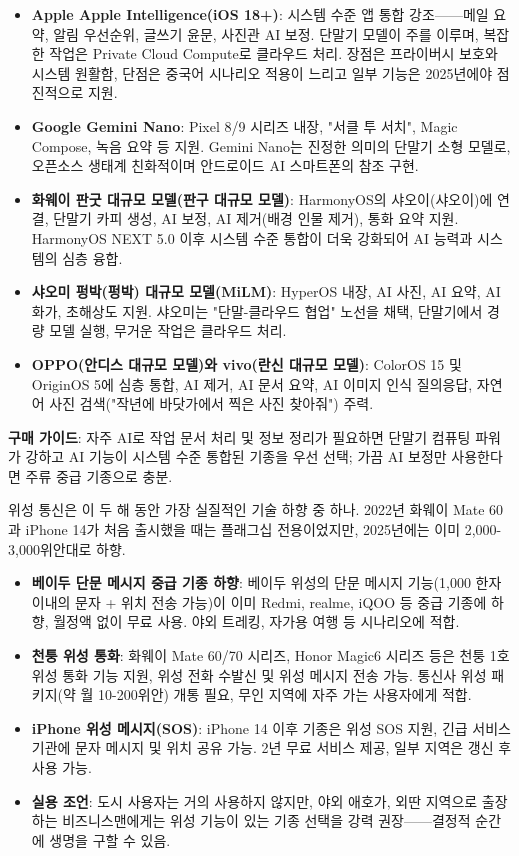 \begin{itemize}
  \item \textbf{Apple Apple Intelligence(iOS 18+)}: 시스템 수준 앱 통합 강조——메일 요약, 알림 우선순위, 글쓰기 윤문, 사진관 AI 보정. 단말기 모델이 주를 이루며, 복잡한 작업은 Private Cloud Compute로 클라우드 처리. 장점은 프라이버시 보호와 시스템 원활함, 단점은 중국어 시나리오 적용이 느리고 일부 기능은 2025년에야 점진적으로 지원.
  \item \textbf{Google Gemini Nano}: Pixel 8/9 시리즈 내장, "서클 투 서치", Magic Compose, 녹음 요약 등 지원. Gemini Nano는 진정한 의미의 단말기 소형 모델로, 오픈소스 생태계 친화적이며 안드로이드 AI 스마트폰의 참조 구현.
  \item \textbf{화웨이 판굿 대규모 모델(판구 대규모 모델)}: HarmonyOS의 샤오이(샤오이)에 연결, 단말기 카피 생성, AI 보정, AI 제거(배경 인물 제거), 통화 요약 지원. HarmonyOS NEXT 5.0 이후 시스템 수준 통합이 더욱 강화되어 AI 능력과 시스템의 심층 융합.
  \item \textbf{샤오미 펑박(펑박) 대규모 모델(MiLM)}: HyperOS 내장, AI 사진, AI 요약, AI 화가, 초해상도 지원. 샤오미는 "단말-클라우드 협업" 노선을 채택, 단말기에서 경량 모델 실행, 무거운 작업은 클라우드 처리.
  \item \textbf{OPPO(안디스 대규모 모델)와 vivo(란신 대규모 모델)}: ColorOS 15 및 OriginOS 5에 심층 통합, AI 제거, AI 문서 요약, AI 이미지 인식 질의응답, 자연어 사진 검색("작년에 바닷가에서 찍은 사진 찾아줘") 주력.
\end{itemize}

\textbf{구매 가이드}: 자주 AI로 작업 문서 처리 및 정보 정리가 필요하면 단말기 컴퓨팅 파워가 강하고 AI 기능이 시스템 수준 통합된 기종을 우선 선택; 가끔 AI 보정만 사용한다면 주류 중급 기종으로 충분.


위성 통신은 이 두 해 동안 가장 실질적인 기술 하향 중 하나. 2022년 화웨이 Mate 60과 iPhone 14가 처음 출시했을 때는 플래그십 전용이었지만, 2025년에는 이미 2,000-3,000위안대로 하향.

\begin{itemize}
  \item \textbf{베이두 단문 메시지 중급 기종 하향}: 베이두 위성의 단문 메시지 기능(1,000 한자 이내의 문자 + 위치 전송 가능)이 이미 Redmi, realme, iQOO 등 중급 기종에 하향, 월정액 없이 무료 사용. 야외 트레킹, 자가용 여행 등 시나리오에 적합.
  \item \textbf{천퉁 위성 통화}: 화웨이 Mate 60/70 시리즈, Honor Magic6 시리즈 등은 천퉁 1호 위성 통화 기능 지원, 위성 전화 수발신 및 위성 메시지 전송 가능. 통신사 위성 패키지(약 월 10-200위안) 개통 필요, 무인 지역에 자주 가는 사용자에게 적합.
  \item \textbf{iPhone 위성 메시지(SOS)}: iPhone 14 이후 기종은 위성 SOS 지원, 긴급 서비스 기관에 문자 메시지 및 위치 공유 가능. 2년 무료 서비스 제공, 일부 지역은 갱신 후 사용 가능.
  \item \textbf{실용 조언}: 도시 사용자는 거의 사용하지 않지만, 야외 애호가, 외딴 지역으로 출장하는 비즈니스맨에게는 위성 기능이 있는 기종 선택을 강력 권장——결정적 순간에 생명을 구할 수 있음.
\end{itemize}

